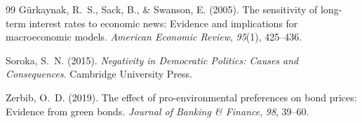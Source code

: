\documentclass[12pt,a4paper]{article}
\begin{document}
\begin{thebibliography}{99}
G\"{u}rkaynak, R.~S., Sack, B., \& Swanson, E. (2005).
The sensitivity of long-term interest rates to economic news: Evidence and implications for macroeconomic models.
\textit{American Economic Review}, \textit{95}(1), 425--436.

Soroka, S.~N. (2015).
\textit{Negativity in Democratic Politics: Causes and Consequences}.
Cambridge University Press.

Zerbib, O.~D. (2019).
The effect of pro-environmental preferences on bond prices: Evidence from green bonds.
\textit{Journal of Banking \& Finance}, \textit{98}, 39--60.

\end{thebibliography}
\end{document}
